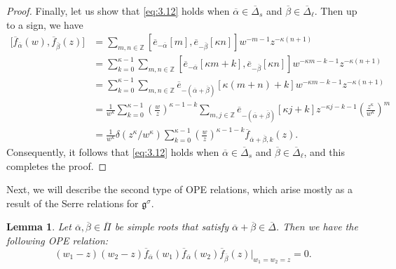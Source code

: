 \documentclass[pdftex]{sigma}
\numberwithin{equation}{section}
\newtheorem{Lemma}[Theorem]{Lemma}
\begin{document}
\begin{proof}
Finally, let us show that \eqref{eq:3.12} holds when $\overline{\alpha}\in\overline{\Delta}_s$ and $\overline{\beta}\in\overline{\Delta}_{\ell}$. Then up to a sign, we have
\begin{align*}
\bigl[\overline{f}_{\overline{\alpha}}(w), \overline{f}_{\overline{\beta}}(z)\bigr]
&=\sum_{m,n\in\mathbb{Z}}[\overline{e}_{-\overline{\alpha}}[m],\overline{e}_{-\overline{\beta}}[\kappa n]]w^{-m-1}z^{-\kappa(n+1)}\\
&=\sum_{k=0}^{\kappa-1}\sum_{m,n\in\mathbb{Z}}[\overline{e}_{-\overline{\alpha}}[\kappa m+k],\overline{e}_{-\overline{\beta}}[\kappa n]]w^{-\kappa m-k-1}z^{-\kappa(n+1)}\\
&=\sum_{k=0}^{\kappa-1}\sum_{m,n\in\mathbb{Z}}\overline{e}_{-\left( \overline{\alpha}+\overline{\beta}\right)}[\kappa(m+n)+k]w^{-\kappa m-k-1}z^{-\kappa(n+1)}\\
&=\frac{1}{w^{\kappa}}\sum_{k=0}^{\kappa-1}\left(\frac{w}{z}\right)^{\kappa-1-k}\sum_{m,j\in\mathbb{Z}}\overline{e}_{-\left(\overline{\alpha}+\overline{\beta} \right)}[\kappa j+k] z^{-\kappa j-k-1}\left(\frac{z^{\kappa}}{w^{\kappa}}\right)^m\\
&=\frac{1}{w^{\kappa}}\delta(z^{\kappa}/w^{\kappa}) \sum_{k=0}^{\kappa-1}\left(\frac{w}{z}\right)^{\kappa-1-k} \overline{f}_{\overline{\alpha}+\overline{\beta},k}(z).
\end{align*}
Consequently, it follows that \eqref{eq:3.12} holds when $\overline{\alpha}\in\overline{\Delta}_s$ and $\overline{\beta}\in\overline{\Delta}_{\ell}$, and this completes the proof.
\end{proof}

Next, we will describe the second type of OPE relations, which arise mostly as a result of the Serre relations for $\mathfrak{g}^{\sigma}$.

\begin{Lemma}\label{3.3}
Let $\overline{\alpha},\overline{\beta}\in\overline{\Pi}$ be simple roots that satisfy $\overline{\alpha}+\overline{\beta} \in\overline{\Delta}$. Then we have the following OPE relation:
\begin{equation}\label{eq:3.13}
(w_1-z)(w_2-z)\overline{f}_{\overline{\alpha}}(w_1) \overline{f}_{\overline{\alpha}}(w_2) \overline{f}_{\overline{\beta}}(z)\big|_{w_1=w_2=z}=0.
\end{equation}
\end{Lemma}
\end{document}

